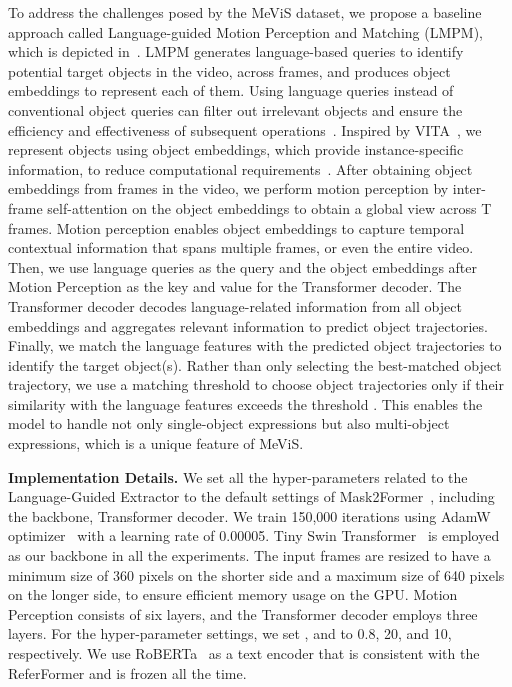 \documentclass[10pt,twocolumn,letterpaper]{article}
\newcommand{\myparagraph}[1]{{\vspace{.5em} \noindent \bf #1}}
\newcommand{\ourdataset}{MeViS\xspace}
\newcommand{\ourmodel}{LMPM\xspace}
\begin{document}
\vspace{-0.5mm}
To address the challenges posed by the \ourdataset dataset, we propose a baseline approach called Language-guided Motion Perception and Matching (\ourmodel), which is depicted in~. \ourmodel generates  language-based queries to identify potential target objects in the video, across  frames, and produces object embeddings to represent each of them. Using language queries instead of conventional object queries can filter out irrelevant objects and ensure the efficiency and effectiveness of subsequent operations~\cite{ding2021vision,vltpami}. 
Inspired by VITA~\cite{VITA}, we represent objects using object embeddings, which provide instance-specific information, to reduce computational requirements~\cite{li2023transformer, li2023tube}. After obtaining object embeddings from frames in the video, we perform motion perception by inter-frame self-attention on the object embeddings to obtain a global view across T frames. Motion perception enables object embeddings to capture temporal contextual information that spans multiple frames, or even the entire video. Then, we use  language queries as the query and the object embeddings after Motion Perception as the key and value for the Transformer decoder. The Transformer decoder decodes language-related information from all object embeddings and aggregates relevant information to predict object trajectories. Finally, we match the language features with the predicted object trajectories to identify the target object(s). Rather than only selecting the best-matched object trajectory, we use a matching threshold  to choose object trajectories only if their similarity with the language features exceeds the threshold . This enables the model to handle not only single-object expressions but also multi-object expressions, which is a unique feature of \ourdataset.

\myparagraph{Implementation Details.} {We set all the hyper-parameters related to the Language-Guided Extractor to the default settings of Mask2Former~\cite{mask2former}, including the backbone, Transformer decoder. We train 150,000 iterations using AdamW optimizer~\cite{loshchilov2017adamw} with a learning rate of 0.00005.
Tiny Swin Transformer~\cite{liu2021swin} is employed as our backbone in all the experiments. The input frames are resized to have a minimum size of 360 pixels on the shorter side and a maximum size of 640 pixels on the longer side, to ensure efficient memory usage on the GPU.
 Motion Perception consists of six layers, and the Transformer decoder employs three layers. For the hyper-parameter settings, we set ,  and  to 0.8, 20, and 10, respectively.
We use RoBERTa~\cite{liu2019roberta} as a text encoder that is consistent with the ReferFormer and is frozen all the time.}
\end{document}
